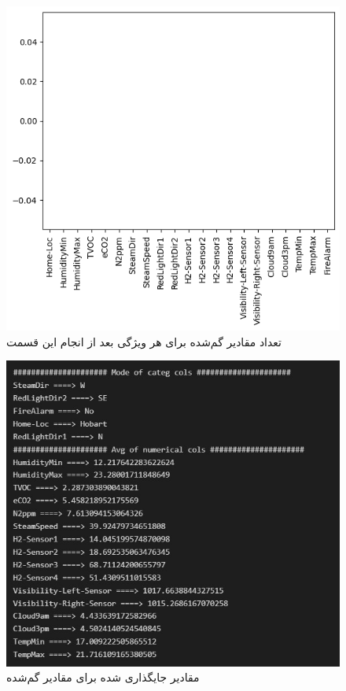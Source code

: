 \documentclass{article}
\begin{document}
\begin{figure}[!h]
    \centering\includegraphics[scale=.55]{./p1-2}
    \caption{تعداد مقادیر گم‌شده برای هر ویژگی بعد از انجام این قسمت}\label{fig.12}
\end{figure}

\begin{figure}[!h]
    \centering\includegraphics[scale=.55]{./p1-3}
    \caption{مقادیر جایگذاری شده برای مقادیر گم‌شده}\label{fig.13}
\end{figure}
\end{document}
